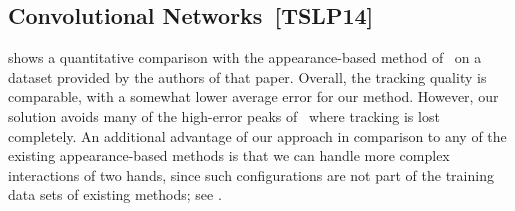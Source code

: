 \subsection*{Convolutional Networks~[TSLP14]}
 shows a quantitative comparison with the appearance-based method of~\cite{tompson2014real} on a dataset provided by the authors of that paper. Overall, the tracking quality is comparable, with a somewhat lower average error for our method. However, our solution avoids many of the high-error peaks of~\cite{tompson2014real} where tracking is lost completely.
%
An additional advantage of our approach in comparison to any of the existing appearance-based methods is that we can handle more complex interactions of two hands, since such configurations are not part of the training data sets of existing methods; see . 








%



